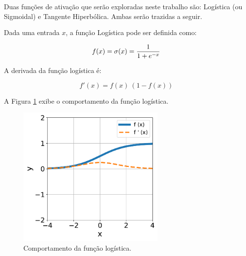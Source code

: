Duas funções de ativação que serão exploradas neste trabalho são: Logística (ou Sigmoidal) e Tangente Hiperbólica. Ambas serão trazidas a seguir.



\linebreak
\newpage


\begin{definition}
    Dada uma entrada $x$, a função Logística pode ser definida como:

    \begin{equation}
        f(x) = \sigma (x) = \dfrac{1}{1 + e^{-x}}
        \vspace{0.2cm}
        \label{eq:ann_logistic_function}
    \end{equation}

    A derivada da função logística é:

    \begin{equation}
        f'(x) = f(x)\ (1 - f(x))
        \label{eq:ann_logistic_function_dy}
    \end{equation}
    
\end{definition}

A Figura \ref{fig:ann_logistic_function} exibe o comportamento da função logística.

\begin{figure}[H]
    \centering
    \includegraphics[width=0.65\textwidth]{figs/ann_logistic_function.pdf}

    \caption{Comportamento da função logística.}
    \label{fig:ann_logistic_function}
\end{figure}





